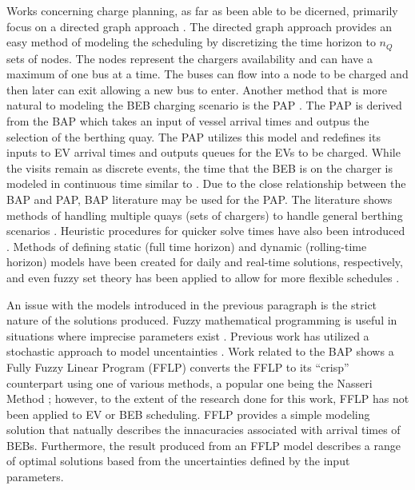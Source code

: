 \documentclass[ee,msthesis]{usuthesis}
\begin{document}
Works concerning charge planning, as far as been able to be dicerned, primarily focus on a directed graph approach
\cite{whitaker-2023-a-network,liu-2020-batter-elect}. The directed graph approach provides an easy method of modeling
the scheduling by discretizing the time horizon to \(n_Q\) sets of nodes. The nodes represent the chargers availability
and can have a maximum of one bus at a time. The buses can flow into a node to be charged and then later can exit
allowing a new bus to enter. Another method that is more natural to modeling the BEB charging scenario is the PAP
\cite{qarebagh-2019-optim-sched}. The PAP is derived from the BAP which takes an input of vessel arrival times and
outpus the selection of the berthing quay. The PAP utilizes this model and redefines its inputs to EV arrival times and
outputs queues for the EVs to be charged. While the visits remain as discrete events, the time that the BEB is on the
charger is modeled in continuous time similar to \cite{frojan-2015-contin-berth,qarebagh-2019-optim-sched,zhou-2020-collab-optim}. Due to the close relationship between the BAP and PAP, BAP
literature may be used for the PAP. The literature shows methods of handling multiple quays (sets of chargers) to handle
general berthing scenarios \cite{frojan-2015-contin-berth,dai-2008-suppl-chain-analy}. Heuristic procedures for
quicker solve times have also been introduced \cite{imai-2001-dynam-berth}. Methods of defining static (full time
horizon) and dynamic (rolling-time horizon) models have been created for daily and real-time solutions, respectively,
and even fuzzy set theory has been applied to allow for more flexible schedules \cite{bello-2019-fuzzy-activ}.

An issue with the models introduced in the previous paragraph is the strict nature of the solutions produced. Fuzzy
mathematical programming is useful in situations where imprecise parameters exist \cite{bello-2019-fuzzy-activ}.
Previous work has utilized a stochastic approach to model uncentainties \cite{bie-2021-optim-elect,duan-2021-refor-mixed,tang-2019-robus-sched}. Work related to the BAP shows a Fully Fuzzy Linear Program (FFLP)
converts the FFLP to its ``crisp'' counterpart using one of various methods, a popular one being the Nasseri Method
\cite{bello-2019-fuzzy-activ}; however, to the extent of the research done for this work, FFLP has not been applied to
EV or BEB scheduling. FFLP provides a simple modeling solution that natually describes the innacuracies associated with
arrival times of BEBs. Furthermore, the result produced from an FFLP model describes a range of optimal solutions based
from the uncertainties defined by the input parameters.
\end{document}
